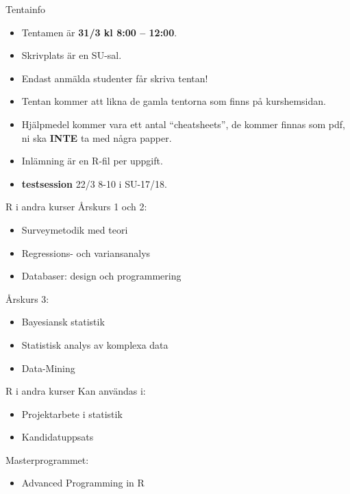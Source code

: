 \documentclass[
  11pt,
  ignorenonframetext,
  handout]{beamer}
\providecommand{\tightlist}{%
  \setlength{\itemsep}{0pt}\setlength{\parskip}{0pt}}
\begin{document}
\begin{frame}{Tentainfo}
\protect\hypertarget{tentainfo}{}
\begin{itemize}
\tightlist
\item
  Tentamen är \textbf{31/3 kl 8:00 -- 12:00}.
\item
  Skrivplats är en SU-sal.
\item
  Endast anmälda studenter får skriva tentan!
\item
  Tentan kommer att likna de gamla tentorna som finns på kurshemsidan.
\item
  Hjälpmedel kommer vara ett antal ``cheatsheets'', de kommer finnas som
  pdf, ni ska \textbf{INTE} ta med några papper.
\item
  Inlämning är en R-fil per uppgift.
\item
  \textbf{testsession} 22/3 8-10 i SU-17/18.
\end{itemize}
\end{frame}

\begin{frame}{R i andra kurser}
\protect\hypertarget{r-i-andra-kurser}{}
Årskurs 1 och 2:

\begin{itemize}
\tightlist
\item
  Surveymetodik med teori
\item
  Regressions- och variansanalys
\item
  Databaser: design och programmering
\end{itemize}

Årskurs 3:

\begin{itemize}
\tightlist
\item
  Bayesiansk statistik
\item
  Statistisk analys av komplexa data
\item
  Data-Mining
\end{itemize}
\end{frame}

\begin{frame}{R i andra kurser}
\protect\hypertarget{r-i-andra-kurser-1}{}
Kan användas i:

\begin{itemize}
\tightlist
\item
  Projektarbete i statistik
\item
  Kandidatuppsats
\end{itemize}

Masterprogrammet:

\begin{itemize}
\tightlist
\item
  Advanced Programming in R
\end{itemize}
\end{frame}
\end{document}
